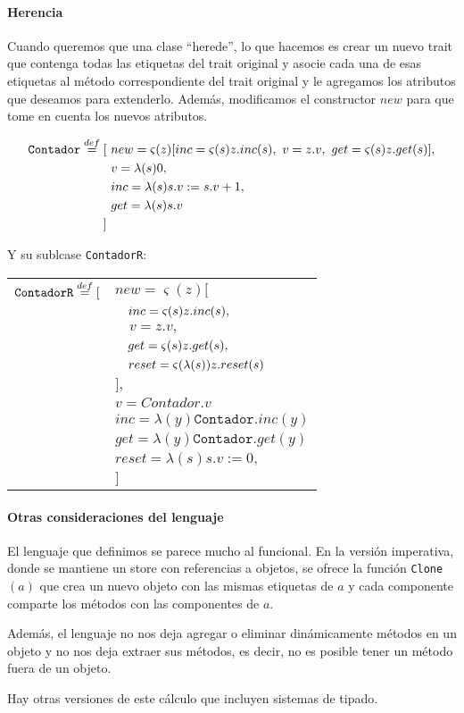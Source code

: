 \paragraph{Herencia} Cuando queremos que una clase ``herede'', lo que hacemos es crear un nuevo trait que contenga todas las etiquetas del trait original y asocie cada una de esas etiquetas al método correspondiente del trait original y le agregamos los atributos que deseamos para extenderlo. Además, modificamos el constructor $new$ para que tome en cuenta los nuevos atributos.

\vspace*{5mm}
\begin{align*}
\texttt{Contador}\overset{def}{=} [~&
new = \varsigma(z)[inc = \varsigma(s)z.inc(s),~v = z.v,~ get = \varsigma(s)z.get(s) ], \\
 & v = \lambda(s)0, \\
 & inc = \lambda(s) s.v := s.v + 1, \\
 & get = \lambda(s) s.v \\
 ]~&  \\
\end{align*}

Y su sublcase \texttt{ContadorR}:

\vspace*{5mm}
\begin{tabular}{ll}
$\texttt{ContadorR}\overset{def}{=} [$ &
$new = \varsigma(z)[$
\\ & $\quad inc = \varsigma(s)z.inc(s),$ \\ 
 & $\quad v = z.v,$ \\
 & $\quad get = \varsigma(s)z.get(s),$ \\
 & $\quad reset = \varsigma(\lambda(s))z.reset(s) $ \\
 & $ ],$ \\
& $v = Contador.v$ \\
& $inc = \lambda(y)\texttt{Contador}.inc(y)$ \\
& $get = \lambda(y)\texttt{Contador}.get(y)$ \\
& $reset = \lambda(s) s.v := 0,$ \\
& $]$ \\
\end{tabular}


\paragraph{Otras consideraciones del lenguaje}
El lenguaje que definimos se parece mucho al funcional. En la versión imperativa, donde se mantiene un store con referencias a objetos, se ofrece la función \texttt{Clone}$(a)$ que crea un nuevo objeto con las mismas etiquetas de $a$ y cada componente comparte los métodos con las componentes de $a$.

Además, el lenguaje no nos deja agregar o eliminar dinámicamente métodos en un objeto y no nos deja extraer sus métodos, es decir, no es posible tener un método fuera de un objeto.

Hay otras versiones de este cálculo que incluyen sistemas de tipado.

